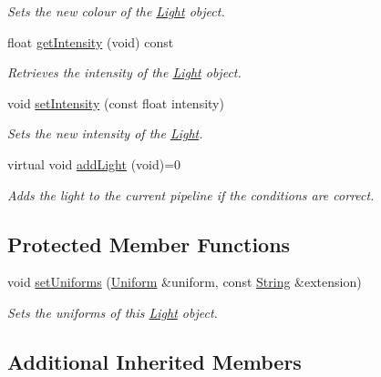 \begin{DoxyCompactItemize}
\begin{DoxyCompactList}\small\item\em Sets the new colour of the \hyperlink{classsparky_1_1_light}{Light} object. \end{DoxyCompactList}\item 
float \hyperlink{classsparky_1_1_light_ac8f1ff096fb82699e1c9e83a67fc5fb3}{get\+Intensity} (void) const 
\begin{DoxyCompactList}\small\item\em Retrieves the intensity of the \hyperlink{classsparky_1_1_light}{Light} object. \end{DoxyCompactList}\item 
void \hyperlink{classsparky_1_1_light_a3d5c2abf7cf3200f3e5fe32d0423c26b}{set\+Intensity} (const float intensity)
\begin{DoxyCompactList}\small\item\em Sets the new intensity of the \hyperlink{classsparky_1_1_light}{Light}. \end{DoxyCompactList}\item 
virtual void \hyperlink{classsparky_1_1_light_a23e37022528ba94549b89b99d2848eb2}{add\+Light} (void)=0\hypertarget{classsparky_1_1_light_a23e37022528ba94549b89b99d2848eb2}{}\label{classsparky_1_1_light_a23e37022528ba94549b89b99d2848eb2}

\begin{DoxyCompactList}\small\item\em Adds the light to the current pipeline if the conditions are correct. \end{DoxyCompactList}\end{DoxyCompactItemize}
\subsection*{Protected Member Functions}
\begin{DoxyCompactItemize}
\item 
void \hyperlink{classsparky_1_1_light_aa0d15140464556c9e5a0a8eaf134e26f}{set\+Uniforms} (\hyperlink{classsparky_1_1_uniform}{Uniform} \&uniform, const \hyperlink{classsparky_1_1_string}{String} \&extension)
\begin{DoxyCompactList}\small\item\em Sets the uniforms of this \hyperlink{classsparky_1_1_light}{Light} object. \end{DoxyCompactList}\end{DoxyCompactItemize}
\subsection*{Additional Inherited Members}


